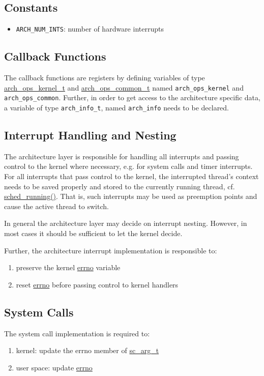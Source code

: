 	\subsection{Constants}
		\begin{itemize}
			\item \lstinline{ARCH_NUM_INTS}: number of hardware interrupts
		\end{itemize}

	\subsection{Callback Functions}
		The callback functions are registers by defining variables of type \hyperref[structarch__ops__kernel__t]{arch\_ops\_kernel\_t} and \hyperref[structarch__ops__common__t]{arch\_ops\_common\_t} named \lstinline{arch_ops_kernel} and \lstinline{arch_ops_common}. Further, in order to get access to the architecture specific data, a variable of type \lstinline{arch_info_t}, named \lstinline{arch_info} needs to be declared.

	\subsection{Interrupt Handling and Nesting}
		The architecture layer is responsible for handling all interrupts and passing control to the kernel where necessary, e.g. for system calls and timer interrupts. For all interrupts that pass control to the kernel, the interrupted thread's context needs to be saved properly and stored to the currently running thread, cf. \hyperref[kernel_2sched_8c_a34a33397e7197f803feffb423ce6717a]{sched\_running()}. That is, such interrupts may be used as preemption points and cause the active thread to switch.

		In general the architecture layer may decide on interrupt nesting. However, in most cases it should be sufficient to let the kernel decide.

		Further, the architecture interrupt implementation is responsible to:
		\begin{enumerate}
			\item preserve the kernel \hyperref[errno_8h_ad65a8842cc674e3ddf69355898c0ecbf]{errno} variable
			\item reset \hyperref[errno_8h_ad65a8842cc674e3ddf69355898c0ecbf]{errno} before passing control to kernel handlers
		\end{enumerate}

	\subsection{System Calls}
		The system call implementation is required to:
		\begin{enumerate}
			\item kernel: update the errno member of \hyperref[sys_2syscall_8h_structsc__arg__t]{sc\_arg\_t}
			\item user space: update \hyperref[errno_8h_ad65a8842cc674e3ddf69355898c0ecbf]{errno}
		\end{enumerate}

